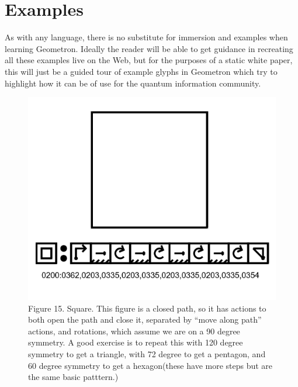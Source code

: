 \documentclass[11pt]{article}
\begin{document}
\section{Examples}


    As with any language, there is no substitute for immersion and examples when learning Geometron.  Ideally the reader will be able to get guidance in recreating all these examples live on the Web, but for the purposes of a static white paper, this will just be a guided tour of example glyphs in Geometron which try to highlight how it can be of use for the quantum information community.



\begin{figure}

\includegraphics[width=\linewidth]{figures/figure15_square.png}

\caption{Figure 15. Square.  This figure is a closed path, so it has actions to both open the path and close it, separated by ``move along path'' actions, and rotations, which assume we are on a 90 degree symmetry.  A good exercise is to repeat this with 120 degree symmetry to get a triangle, with 72 degree to get a pentagon, and 60 degree symmetry to get a hexagon(these have more steps but are the same basic patttern.)}
\end{figure}
\end{document}
